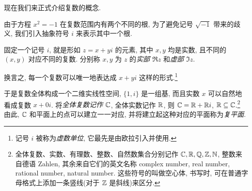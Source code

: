 现在我们来正式介绍复数的概念.

由于方程 $x^2=-1$ 在复数范围内有两个不同的根, 为了避免记号 $\sqrt{-1}$ 带来的歧义, 我们引入抽象符号 $i$ 来表示其中一个根.

\begin{definition}
  固定一个记号 $i$, 就是形如 $z=x+yi$ 的元素, 其中 $x,y$ 均是实数, 且不同的 $(x,y)$ 对应不同的复数.
  分别称 $x,y$ 为 $z$ 的\emph{实部 $\Re z$} 和\emph{虚部 $\Im z$}.
\end{definition}

换言之, 每一个复数可以唯一地表达成 $x+yi$ 这样的形式.\footnote{记号 $i$ 被称为\emph{虚数单位}, 它最先是由欧拉引入并使用.}

于是复数全体构成一个二维实线性空间, $\{1,i\}$ 是一组基, 而且实数 $x$ 可以自然地看成复数 $x+0i$.
将\emph{全体复数记作 ${\mathbb{C}}$}, 全体实数记作 ${\mathbb{R}}$, 则 ${\mathbb{C}}={\mathbb{R}}+{\mathbb{R}} i$, ${\mathbb{R}}\subseteq {\mathbb{C}}$.\footnote{
  全体复数、实数、有理数、整数、自然数集合分别记作 ${\mathbb{C}},{\mathbb{R}},{\mathbb{Q}},{\mathbb{Z}},{\mathbb{N}}$, 整数来自德语 Zahlen, 其余来自它们的英文名称 complex number, real number, rational number, natural number.
  这些符号的叫做空心体, 书写时, 可在普通字母格式上添加一条竖线(对于 ${\mathbb{Z}}$ 是斜线)来区分.
}
由此, ${\mathbb{C}}$ 和平面上的点可以建立一一对应, 并将建立起这种对应的平面称为\emph{复平面}.

